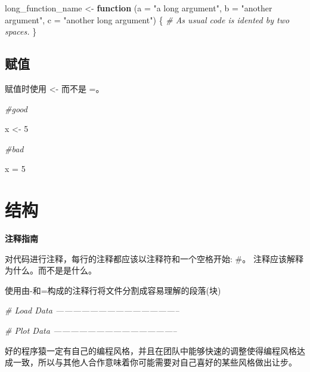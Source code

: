 \documentclass[]{book}
\newenvironment{Shaded}{\begin{snugshade}}{\end{snugshade}}
\newcommand{\DataTypeTok}[1]{\textcolor[rgb]{0.13,0.29,0.53}{#1}}
\newcommand{\DecValTok}[1]{\textcolor[rgb]{0.00,0.00,0.81}{#1}}
\newcommand{\StringTok}[1]{\textcolor[rgb]{0.31,0.60,0.02}{#1}}
\newcommand{\CommentTok}[1]{\textcolor[rgb]{0.56,0.35,0.01}{\textit{#1}}}
\newcommand{\ControlFlowTok}[1]{\textcolor[rgb]{0.13,0.29,0.53}{\textbf{#1}}}
\newcommand{\NormalTok}[1]{#1}
\begin{document}
\begin{Shaded}
\begin{Highlighting}[]
\NormalTok{long_function_name <-}\StringTok{ }\ControlFlowTok{function}\NormalTok{ (}\DataTypeTok{a =} \StringTok{"a long argument"}\NormalTok{,}
                                \DataTypeTok{b =} \StringTok{"another argument"}\NormalTok{,}
                                \DataTypeTok{c =} \StringTok{"another long argument"}\NormalTok{) \{}
  \CommentTok{# As usual code is idented by two spaces.}
\NormalTok{\}}
\end{Highlighting}
\end{Shaded}

\subsection{赋值}

赋值时使用 \textless{}- 而不是 =。

\begin{Shaded}
\begin{Highlighting}[]
\CommentTok{#good}

\NormalTok{x <-}\StringTok{ }\DecValTok{5}

\CommentTok{#bad}

\NormalTok{x =}\StringTok{ }\DecValTok{5}
\end{Highlighting}
\end{Shaded}

\section{结构}

\textbf{注释指南}

对代码进行注释，每行的注释都应该以注释符和一个空格开始: \#。
注释应该解释为什么。而不是是什么。

使用由-和=构成的注释行将文件分割成容易理解的段落(块)

\begin{Shaded}
\begin{Highlighting}[]
\CommentTok{# Load Data --------------------------------------------}

\CommentTok{# Plot Data --------------------------------------------}
\end{Highlighting}
\end{Shaded}

好的程序猿一定有自己的编程风格，并且在团队中能够快速的调整使得编程风格达成一致，所以与其他人合作意味着你可能需要对自己喜好的某些风格做出让步。
\end{document}
